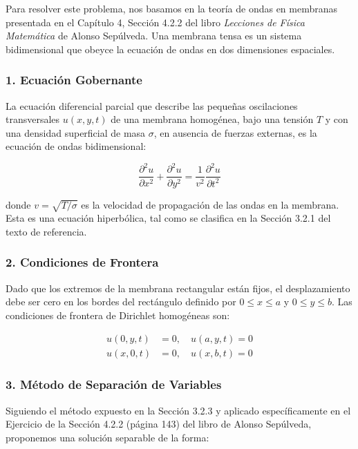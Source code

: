\documentclass[a4paper]{article}
\begin{document}
Para resolver este problema, nos basamos en la teoría de ondas en membranas presentada en el Capítulo 4, Sección 4.2.2 del libro \textit{Lecciones de Física Matemática} de Alonso Sepúlveda. Una membrana tensa es un sistema bidimensional que obeyce la ecuación de ondas en dos dimensiones espaciales.

\subsubsection{1. Ecuación Gobernante}

La ecuación diferencial parcial que describe las pequeñas oscilaciones transversales $u(x, y, t)$ de una membrana homogénea, bajo una tensión $T$ y con una densidad superficial de masa $\sigma$, en ausencia de fuerzas externas, es la ecuación de ondas bidimensional:

\begin{equation}
\frac{\partial^2 u}{\partial x^2} + \frac{\partial^2 u}{\partial y^2} = \frac{1}{v^2} \frac{\partial^2 u}{\partial t^2}
\label{eq:onda2d}
\end{equation}

donde $v = \sqrt{T/\sigma}$ es la velocidad de propagación de las ondas en la membrana. Esta es una ecuación hiperbólica, tal como se clasifica en la Sección 3.2.1 del texto de referencia.

\subsubsection{2. Condiciones de Frontera}

Dado que los extremos de la membrana rectangular están fijos, el desplazamiento debe ser cero en los bordes del rectángulo definido por $0 \leq x \leq a$ y $0 \leq y \leq b$. Las condiciones de frontera de Dirichlet homogéneas son:

\begin{align}
u(0, y, t) &= 0, \quad u(a, y, t) = 0 \label{eq:bc_x} \\
u(x, 0, t) &= 0, \quad u(x, b, t) = 0 \label{eq:bc_y}
\end{align}

\subsubsection{3. Método de Separación de Variables}

Siguiendo el método expuesto en la Sección 3.2.3 y aplicado específicamente en el Ejercicio de la Sección 4.2.2 (página 143) del libro de Alonso Sepúlveda, proponemos una solución separable de la forma:
\end{document}
